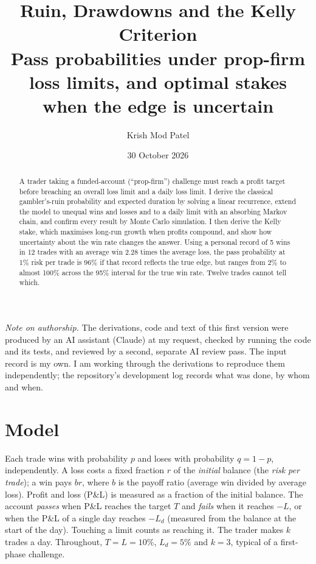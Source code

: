 \documentclass[11pt,a4paper]{article}
\title{Ruin, Drawdowns and the Kelly Criterion\\[0.3em]
\large Pass probabilities under prop-firm loss limits, and optimal stakes when the edge is uncertain}
\author{Krish Mod Patel}
\date{30 October 2026}
\begin{document}
\maketitle

\begin{abstract}
A trader taking a funded-account (``prop-firm'') challenge must reach a profit target
before breaching an overall loss limit and a daily loss limit. I derive the classical
gambler's-ruin probability and expected duration by solving a linear recurrence, extend
the model to unequal wins and losses and to a daily limit with an absorbing Markov chain,
and confirm every result by Monte Carlo simulation. I then derive the Kelly stake, which
maximises long-run growth when profits compound, and show how uncertainty about the win
rate changes the answer. Using a personal record of 5 wins in 12 trades with an average
win 2.28 times the average loss, the pass probability at 1\% risk per trade is 96\% if
that record reflects the true edge, but ranges from 2\% to almost 100\% across the 95\%
interval for the true win rate. Twelve trades cannot tell which.
\end{abstract}

\noindent\textit{Note on authorship.} The derivations, code and text of this first
version were produced by an AI assistant (Claude) at my request, checked by running the
code and its tests, and reviewed by a second, separate AI review pass. The input record
is my own. I am working through the derivations to reproduce them independently; the
repository's development log records what was done, by whom and when.

\section{Model}

Each trade wins with probability $p$ and loses with probability $q = 1-p$,
independently. A loss costs a fixed fraction $r$ of the \emph{initial} balance (the
\emph{risk per trade}); a win pays $b r$, where $b$ is the payoff ratio (average win
divided by average loss). Profit and loss (P\&L) is measured as a fraction of the initial
balance. The account \emph{passes} when P\&L reaches the target $T$ and \emph{fails} when
it reaches $-L$, or when the P\&L of a single day reaches $-L_d$ (measured from the
balance at the start of the day). Touching a limit counts as reaching it. The trader
makes $k$ trades a day. Throughout, $T = L = 10\%$, $L_d = 5\%$ and $k = 3$, typical of
a first-phase challenge.
\end{document}

